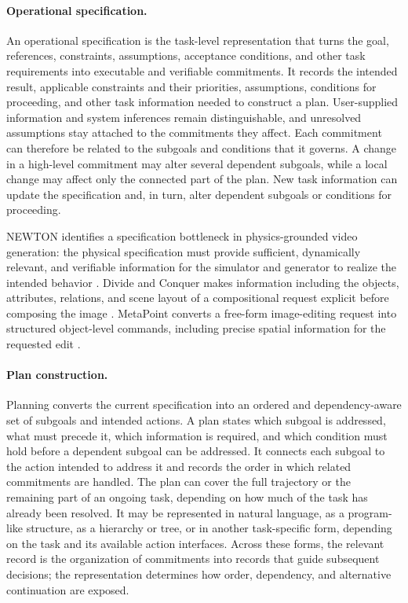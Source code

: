 \paragraph{Operational specification.}
An operational specification is the task-level representation that turns the goal, references, constraints, assumptions, acceptance conditions, and other task requirements into executable and verifiable commitments. It records the intended result, applicable constraints and their priorities, assumptions, conditions for proceeding, and other task information needed to construct a plan. User-supplied information and system inferences remain distinguishable, and unresolved assumptions stay attached to the commitments they affect. Each commitment can therefore be related to the subgoals and conditions that it governs. A change in a high-level commitment may alter several dependent subgoals, while a local change may affect only the connected part of the plan. New task information can update the specification and, in turn, alter dependent subgoals or conditions for proceeding.

NEWTON identifies a specification bottleneck in physics-grounded video generation: the physical specification must provide sufficient, dynamically relevant, and verifiable information for the simulator and generator to realize the intended behavior \cite{feng2026newton}. Divide and Conquer makes information including the objects, attributes, relations, and scene layout of a compositional request explicit before composing the image \cite{wang2024divide}. MetaPoint converts a free-form image-editing request into structured object-level commands, including precise spatial information for the requested edit \cite{zhou2026metapoint}.

\paragraph{Plan construction.}
Planning converts the current specification into an ordered and dependency-aware set of subgoals and intended actions. A plan states which subgoal is addressed, what must precede it, which information is required, and which condition must hold before a dependent subgoal can be addressed. It connects each subgoal to the action intended to address it and records the order in which related commitments are handled. The plan can cover the full trajectory or the remaining part of an ongoing task, depending on how much of the task has already been resolved. It may be represented in natural language, as a program-like structure, as a hierarchy or tree, or in another task-specific form, depending on the task and its available action interfaces. Across these forms, the relevant record is the organization of commitments into records that guide subsequent decisions; the representation determines how order, dependency, and alternative continuation are exposed.


